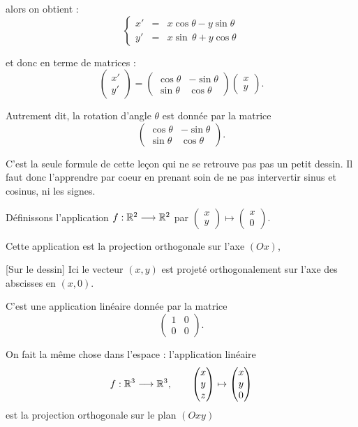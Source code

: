 alors on obtient :
$$\left\{\begin{array}{rcl}
x' & = & x \cos  \theta - y \sin\theta\\
y' & = & x\sin \, \theta + y \cos\theta
\end{array}\right.$$

et donc en terme de matrices :
$$
\begin{pmatrix}x' \\ y' \end{pmatrix}
= \begin{pmatrix}
\cos\theta & -\sin\theta\\
\sin\theta & \cos\theta
\end{pmatrix}
\begin{pmatrix}x \\ y \end{pmatrix}.
$$ 

Autrement dit, la rotation d'angle $\theta$ est donnée par la matrice 
$$\begin{pmatrix}
\cos\theta & -\sin\theta\\
\sin\theta & \cos\theta
\end{pmatrix}.$$

C'est la seule formule de cette leçon qui ne se retrouve pas 
pas un petit dessin. Il faut donc l'apprendre par coeur en prenant soin de ne pas intervertir
sinus et cosinus, ni les signes.

\diapo

Définissons l'application
$f: \mathbb{R}^2  \longrightarrow \mathbb{R}^2$
par $\begin{pmatrix}x\\y\end{pmatrix} \mapsto 
\begin{pmatrix}x\\0\end{pmatrix}$.

Cette application est la projection orthogonale sur l'axe $(Ox)$,

[Sur le dessin] 
Ici le vecteur $(x,y)$ est projeté orthogonalement sur l'axe des abscisses
en $(x,0)$.

C'est une application linéaire donnée par la matrice 
$$\begin{pmatrix} 1 & 0 \\ 0 & 0 \end{pmatrix}.$$

\change

On fait la même chose dans l'espace : l'application linéaire 
$$f: \mathbb{R}^3  \longrightarrow \mathbb{R}^3, \qquad
\begin{pmatrix}x\\y\\z\end{pmatrix}  \mapsto \begin{pmatrix}x\\y\\0\end{pmatrix}$$
est la projection orthogonale sur le plan $(Oxy)$ 

